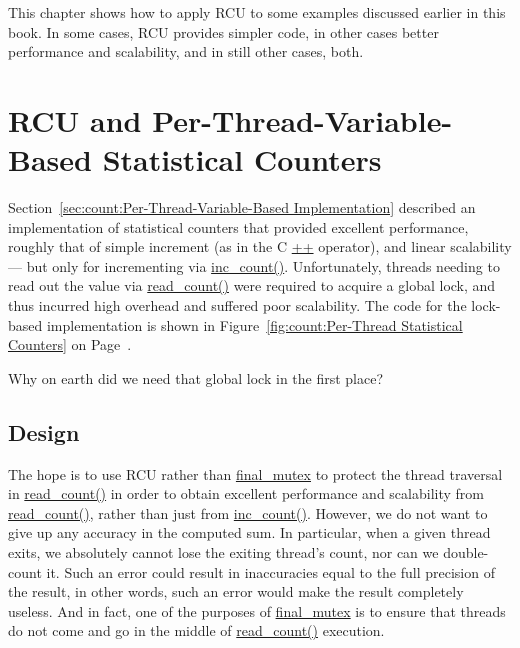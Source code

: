 

This chapter shows how to apply RCU to some examples discussed earlier
in this book.
In some cases, RCU provides simpler code, in other cases better
performance and scalability, and in still other cases, both.

\section{RCU and Per-Thread-Variable-Based Statistical Counters}
\label{sec:applyrcu:RCU and Per-Thread-Variable-Based Statistical Counters}

Section~\ref{sec:count:Per-Thread-Variable-Based Implementation}
described an implementation of statistical counters that provided
excellent
performance, roughly that of simple increment (as in the C \url{++}
operator), and linear scalability --- but only for incrementing
via \url{inc_count()}.
Unfortunately, threads needing to read out the value via \url{read_count()}
were required to acquire a global
lock, and thus incurred high overhead and suffered poor scalability.
The code for the lock-based implementation is shown in
Figure~\ref{fig:count:Per-Thread Statistical Counters} on
Page~\pageref{fig:count:Per-Thread Statistical Counters}.

\QuickQuiz{}
	Why on earth did we need that global lock in the first place?
 \QuickQuizEnd

\subsection{Design}

The hope is to use RCU rather than \url{final_mutex} to protect the
thread traversal in \url{read_count()} in order to obtain excellent
performance and scalability from \url{read_count()}, rather than just
from \url{inc_count()}.
However, we do not want to give up any accuracy in the computed sum.
In particular, when a given thread exits, we absolutely cannot
lose the exiting thread's count, nor can we double-count it.
Such an error could result in inaccuracies equal to the full
precision of the result, in other words, such an error would
make the result completely useless.
And in fact, one of the purposes of \url{final_mutex} is to
ensure that threads do not come and go in the middle of \url{read_count()}
execution.

